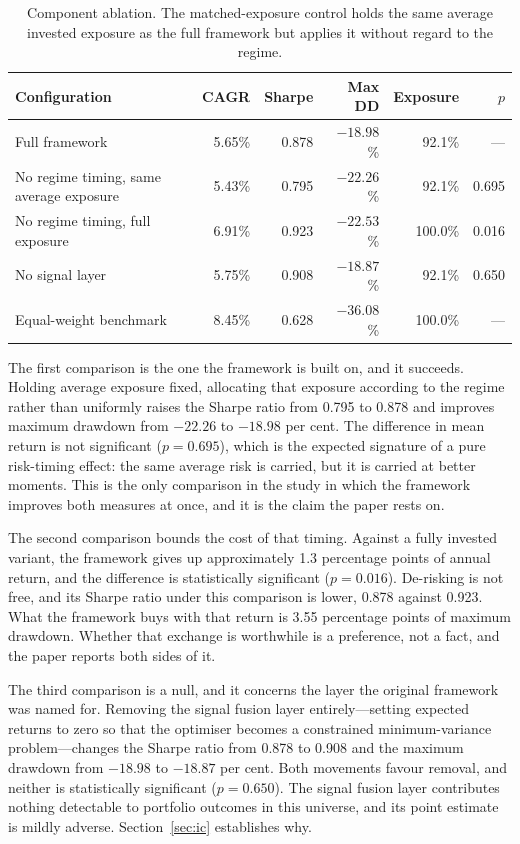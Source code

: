 \documentclass{singlecol-new}
\theoremstyle{TH}{
\newtheorem{lemma}{Lemma}
\newtheorem{theorem}[lemma]{Theorem}
\newtheorem{corrolary}[lemma]{Corrolary}
\newtheorem{conjecture}[lemma]{Conjecture}
\newtheorem{proposition}[lemma]{Proposition}
\newtheorem{claim}[lemma]{Claim}
\newtheorem{stheorem}[lemma]{Wrong Theorem}
\newtheorem{algorithm}{Algorithm}
}
\theoremstyle{THrm}{
\newtheorem{definition}{Definition}[section]
\newtheorem{question}{Question}[section]
\newtheorem{remark}{Remark}
\newtheorem{scheme}{Scheme}
}
\theoremstyle{THhit}{
\newtheorem{case}{Case}[section]
}
\begin{document}
\begin{table}[!ht]
\centering
\caption{Component ablation. The matched-exposure control holds the same average
invested exposure as the full framework but applies it without regard to the regime.}
\label{tab:ablation}
\small
\begin{tabular}{p{4.8cm}rrrrr}
\hline
\textbf{Configuration} & \textbf{CAGR} & \textbf{Sharpe} & \textbf{Max DD} & \textbf{Exposure} & \textbf{$p$} \\
\hline
Full framework & 5.65\% & 0.878 & $-18.98$\% & 92.1\% & --- \\
No regime timing, same average exposure & 5.43\% & 0.795 & $-22.26$\% & 92.1\% & 0.695 \\
No regime timing, full exposure & 6.91\% & 0.923 & $-22.53$\% & 100.0\% & 0.016 \\
No signal layer & 5.75\% & 0.908 & $-18.87$\% & 92.1\% & 0.650 \\
Equal-weight benchmark & 8.45\% & 0.628 & $-36.08$\% & 100.0\% & --- \\
\hline
\end{tabular}
\end{table}

The first comparison is the one the framework is built on, and it succeeds. Holding
average exposure fixed, allocating that exposure according to the regime rather than
uniformly raises the Sharpe ratio from 0.795 to 0.878 and improves maximum drawdown
from $-22.26$ to $-18.98$ per cent. The difference in mean return is not significant
($p = 0.695$), which is the expected signature of a pure risk-timing effect: the same
average risk is carried, but it is carried at better moments. This is the only
comparison in the study in which the framework improves both measures at once, and it
is the claim the paper rests on.

The second comparison bounds the cost of that timing. Against a fully invested variant,
the framework gives up approximately 1.3 percentage points of annual return, and the
difference is statistically significant ($p = 0.016$). De-risking is not free, and its
Sharpe ratio under this comparison is lower, 0.878 against 0.923. What the framework
buys with that return is 3.55 percentage points of maximum drawdown. Whether that
exchange is worthwhile is a preference, not a fact, and the paper reports both sides of
it.

The third comparison is a null, and it concerns the layer the original framework was
named for. Removing the signal fusion layer entirely---setting expected returns to
zero so that the optimiser becomes a constrained minimum-variance problem---changes the
Sharpe ratio from 0.878 to 0.908 and the maximum drawdown from $-18.98$ to $-18.87$ per
cent. Both movements favour removal, and neither is statistically significant
($p = 0.650$). The signal fusion layer contributes nothing detectable to portfolio
outcomes in this universe, and its point estimate is mildly adverse.
Section~\ref{sec:ic} establishes why.
\end{document}
